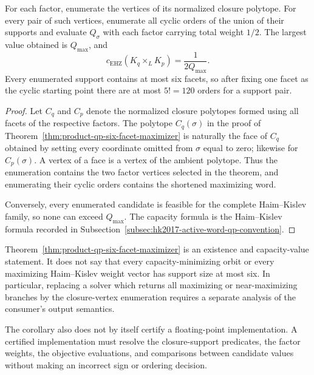 \begin{corollary}
\label{cor:product-qp-closure-vertex-enumeration}
For each factor, enumerate the vertices of its normalized closure polytope.
For every pair of such vertices, enumerate all cyclic orders of the union of
their supports and evaluate \(Q_\sigma\) with each factor carrying total
weight \(1/2\).  The largest value obtained is \(Q_{\max}\), and
\[
  c_{\mathrm{EHZ}}(K_q\times_LK_p)=\frac{1}{2Q_{\max}}.
\]
Every enumerated support contains at most six facets, so after fixing one
facet as the cyclic starting point there are at most \(5!=120\) orders for a
support pair.
\end{corollary}

\begin{proof}
Let \(C_q\) and \(C_p\) denote the normalized closure polytopes formed using
all facets of the respective factors.  The polytope \(C_q(\sigma)\) in the
proof of Theorem~\ref{thm:product-qp-six-facet-maximizer} is naturally the
face of \(C_q\) obtained by setting every coordinate omitted from \(\sigma\)
equal to zero; likewise for \(C_p(\sigma)\).  A vertex of a face is a vertex
of the ambient polytope.  Thus the enumeration contains the two factor
vertices selected in the theorem, and enumerating their cyclic orders contains
the shortened maximizing word.

Conversely, every enumerated candidate is feasible for the complete
Haim--Kislev family, so none can exceed \(Q_{\max}\).  The capacity formula is
the Haim--Kislev formula recorded in
Subsection~\ref{subsec:hk2017-active-word-qp-convention}.
\end{proof}

\begin{remark}
\label{rem:product-qp-six-facet-scope}
Theorem~\ref{thm:product-qp-six-facet-maximizer} is an existence and
capacity-value statement.  It does not say that every capacity-minimizing
orbit or every maximizing Haim--Kislev weight vector has support size at most
six.  In particular, replacing a solver which returns all maximizing or
near-maximizing branches by the closure-vertex enumeration requires a separate
analysis of the consumer's output semantics.

The corollary also does not by itself certify a floating-point implementation.
A certified implementation must resolve the closure-support predicates, the
factor weights, the objective evaluations, and comparisons between candidate
values without making an incorrect sign or ordering decision.
\end{remark}


